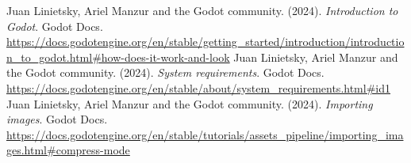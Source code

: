 
\begin{thebibliography}{99}
     Juan Linietsky, Ariel Manzur and the Godot community. (2024). \textit{Introduction to Godot}. Godot Docs. \url{https://docs.godotengine.org/en/stable/getting\_started/introduction/introduction\_to\_godot.html#how-does-it-work-and-look}
     Juan Linietsky, Ariel Manzur and the Godot community. (2024). \textit{System requirements}. Godot Docs. \url{https://docs.godotengine.org/en/stable/about/system_requirements.html#id1}
     Juan Linietsky, Ariel Manzur and the Godot community. (2024). \textit{Importing images}. Godot Docs. \url{https://docs.godotengine.org/en/stable/tutorials/assets\_pipeline/importing\_images.html#compress-mode}
    
\end{thebibliography}
